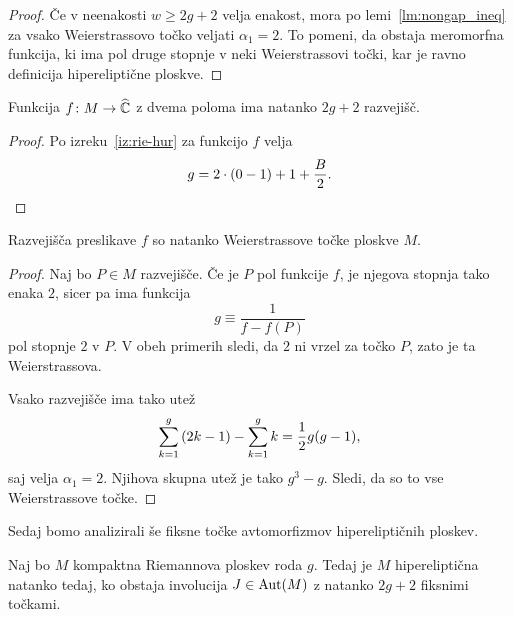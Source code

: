 \begin{proof}
Če v neenakosti $w \geq 2g + 2$ velja enakost, mora po
lemi~\ref{lm:nongap_ineq} za vsako Weierstrassovo točko veljati
$\alpha_1 = 2$. To pomeni, da obstaja meromorfna funkcija, ki ima
pol druge stopnje v neki Weierstrassovi točki, kar je ravno
definicija hipereliptične ploskve.
\end{proof}

\begin{trditev}
Funkcija $f \colon M \to \widehat{\mathbb{C}}$ z dvema poloma ima natanko $2g+2$
razvejišč.
\end{trditev}

\begin{proof}
Po izreku~\ref{iz:rie-hur} za funkcijo $f$ velja
\[
g = 2 \cdot (0-1) + 1 + \frac{B}{2}. \qedhere
\]
\end{proof}

\begin{trditev}
Razvejišča preslikave $f$ so natanko Weierstrassove točke ploskve
$M$.
\end{trditev}

\begin{proof}
Naj bo $P \in M$ razvejišče. Če je $P$ pol funkcije $f$, je njegova
stopnja tako enaka $2$, sicer pa ima funkcija
\[
g \equiv \frac{1}{f - f(P)}
\]
pol stopnje $2$ v $P$. V obeh primerih sledi, da $2$ ni vrzel za
točko $P$, zato je ta Weierstrassova.

Vsako razvejišče ima tako utež
\[
\sum_{k=1}^g \left(2k-1\right) - \sum_{k=1}^g k = \frac{1}{2} g (g-1),
\]
saj velja $\alpha_1 = 2$. Njihova skupna utež je tako $g^3 - g$.
Sledi, da so to vse Weierstrassove točke.
\end{proof}

Sedaj bomo analizirali še fiksne točke avtomorfizmov
hipereliptičnih ploskev.

\begin{trditev}
Naj bo $M$ kompaktna Riemannova ploskev roda $g$. Tedaj je $M$
hipereliptična natanko tedaj, ko obstaja involucija $J \in \operatorname{Aut}(M)$
z natanko $2g + 2$ fiksnimi točkami.
\end{trditev}

